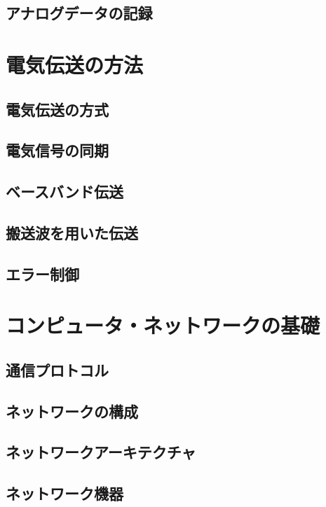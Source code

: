 \documentclass[a4j,12pt]{jreport}
\begin{document}
\chapter{アナログデータの記録}


\part{電気伝送の方法}

\chapter{電気伝送の方式}


\chapter{電気信号の同期}


\chapter{ベースバンド伝送}

\chapter{搬送波を用いた伝送}

\chapter{エラー制御}

\part{コンピュータ・ネットワークの基礎}

\chapter{通信プロトコル}

\chapter{ネットワークの構成}

\chapter{ネットワークアーキテクチャ}

\chapter{ネットワーク機器}
\end{document}
